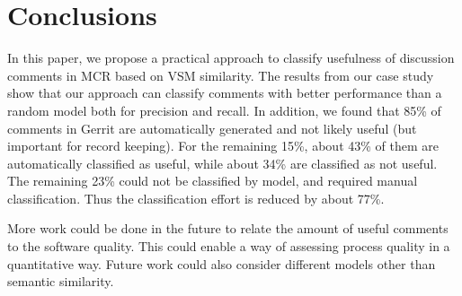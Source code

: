 
\section{Conclusions}

In this paper, we propose a practical approach to classify usefulness of discussion comments in MCR based on VSM similarity.
The results from our case study show that our approach can classify comments with better performance than a random model both for precision and recall.
In addition, we found that 85\% of comments in Gerrit are automatically generated and not likely useful (but important for record keeping).
For the remaining 15\%, about 43\% of them are automatically classified as useful, while about 34\% are classified as not useful.
The remaining 23\% could not be classified by model, and required manual classification.
Thus the classification effort is reduced by about 77\%.

More work could be done in the future to relate the amount of useful comments to the software quality.
This could enable a way of assessing process quality in a quantitative way.
Future work could also consider different models other than semantic similarity.